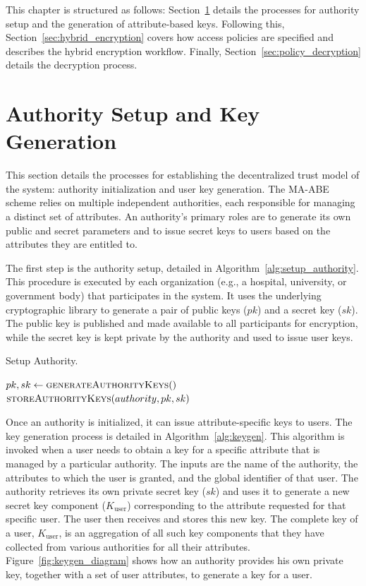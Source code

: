 \documentclass[cic,tc,english]{iiufrgs}
\numberwithin{algorithm}{chapter}
\begin{document}
    This chapter is structured as follows: Section~\ref{sec:auth_setup} details the processes for authority setup and the generation of attribute-based keys. Following this, Section~\ref{sec:hybrid_encryption} covers how access policies are specified and describes the hybrid encryption workflow. Finally, Section~\ref{sec:policy_decryption} details the decryption process.

    \section{Authority Setup and Key Generation}
        \label{sec:auth_setup}
        This section details the processes for establishing the decentralized trust model of the system: authority initialization and user key generation. The MA-ABE scheme relies on multiple independent authorities, each responsible for managing a distinct set of attributes. An authority's primary roles are to generate its own public and secret parameters and to issue secret keys to users based on the attributes they are entitled to. 

        The first step is the authority setup, detailed in Algorithm~\ref{alg:setup_authority}. This procedure is executed by each organization (e.g., a hospital, university, or government body) that participates in the system. It uses the underlying cryptographic library to generate a pair of public keys ($pk$) and a secret key ($sk$). The public key is published and made available to all participants for encryption, while the secret key is kept private by the authority and used to issue user keys.

        \begin{algorithm}[h]
            \caption{Setup Authority.}
            \label{alg:setup_authority}
            \begin{algorithmic}[1]
                \State $pk, sk \gets \textsc{generateAuthorityKeys}()$
                \State $\textsc{storeAuthorityKeys}(authority, pk, sk)$
            \EndProcedure
            \end{algorithmic}
        \end{algorithm}

        Once an authority is initialized, it can issue attribute-specific keys to users. The key generation process is detailed in Algorithm~\ref{alg:keygen}. This algorithm is invoked when a user needs to obtain a key for a specific attribute that is managed by a particular authority. The inputs are the name of the authority, the attributes to which the user is granted, and the global identifier of that user. The authority retrieves its own private secret key ($sk$) and uses it to generate a new secret key component ($K_{\text{user}}$) corresponding to the attribute requested for that specific user. The user then receives and stores this new key. The complete key of a user, $K_{\text{user}}$, is an aggregation of all such key components that they have collected from various authorities for all their attributes.        Figure~\ref{fig:keygen_diagram} shows how an authority provides his own private key, together with a set of user attributes, to generate a key for a user.
\end{document}
